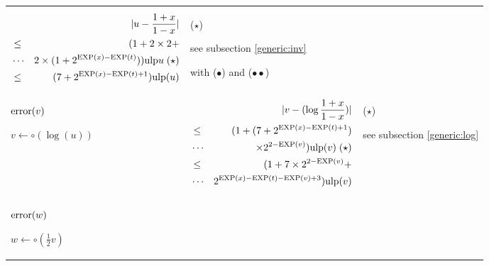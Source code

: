 \documentclass[12pt]{amsart}
\def\ulp{{\rm ulp}}
\def\Exp{{\rm EXP}}
\begin{document}
\begin{center}
\begin{tabular}{l l l}
\begin{minipage}{7.5cm}
\begin{eqnarray}\nonumber
  &&|u-\frac{1+x}{1-x}| \\\nonumber
  &       \leq& (1+ 2 \times 2 + \\\nonumber
  &       \cdots& 2 \times (1+2^{\Exp(x)-\Exp(t)}))\ulp{u} \;(\star)\\\nonumber
  &       \leq& (7+2^{\Exp(x)-\Exp(t)+1})\ulp(u)
\end{eqnarray}


\end{minipage} &
\begin{minipage}{6cm}

($\star$)

see subsection \ref{generic:inv}

with ($\bullet$) and ($\bullet\bullet$)

\end{minipage}\\%
\begin{minipage}{2.5cm}
${\textnormal{error}}(v)$


$v \leftarrow \circ(\log(u)) $


\end{minipage} &
\begin{minipage}{7.5cm}

\begin{eqnarray}\nonumber
  &&|v-(\log{\frac{1+x}{1-x}})| \\\nonumber
  &       \leq& (1+(7+2^{\Exp(x)-\Exp(t)+1}) \\\nonumber
  &       \cdots&  \times 2^{2-\Exp(v)}) \ulp(v)\;(\star)\\\nonumber
  &       \leq& (1+7 \times 2^{2-\Exp(v)} +\\\nonumber
  &       \cdots&  2^{\Exp(x)-\Exp(t)-\Exp(v)+3}) \ulp(v)
\end{eqnarray}


\end{minipage} &
\begin{minipage}{6cm}

($\star$)

see subsection \ref{generic:log}

\end{minipage}\\%
\begin{minipage}{2.5cm}
${\textnormal{error}}(w)$


$w \leftarrow \circ(\frac{1}{2} v) $
\end{minipage} &
\begin{minipage}{7.5cm}


\end{minipage}
\end{tabular}
\end{center}
\end{document}

